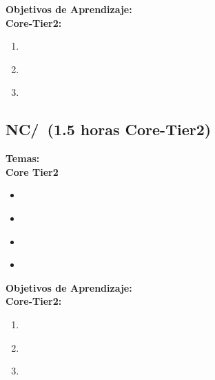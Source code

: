 \noindent \textbf{Objetivos de Aprendizaje:}\\
\noindent \textbf{Core-Tier2:}
\begin{enumerate}
	\setcounter{enumi}{0}
	\item \NCReliableDataDeliveryLODescribeTheReliable\xspace[\NCReliableDataDeliveryLODescribeTheReliableLevel]\label{sec:BOK:NCReliableDataDeliveryLODescribeTheReliable}
	\item \NCReliableDataDeliveryLOListTheAffect\xspace[\NCReliableDataDeliveryLOListTheAffectLevel]\label{sec:BOK:NCReliableDataDeliveryLOListTheAffect}
	\item \NCReliableDataDeliveryLODesignAndSimple\xspace[\NCReliableDataDeliveryLODesignAndSimpleLevel]\label{sec:BOK:NCReliableDataDeliveryLODesignAndSimple}
\end{enumerate}


\subsection{NC/\NCRoutingandForwarding~(1.5 horas Core-Tier2)}\label{sec:BOK:NCRoutingandForwarding}
\noindent \textbf{Temas:}\\
\noindent \textbf{Core Tier2}
\begin{itemize}
	\item \NCRoutingandForwardingTopicRouting\label{sec:BOK:NCRoutingandForwardingTopicRouting}
	\item \NCRoutingandForwardingTopicStatic\label{sec:BOK:NCRoutingandForwardingTopicStatic}
	\item \NCRoutingandForwardingTopicInternet\label{sec:BOK:NCRoutingandForwardingTopicInternet}
	\item \NCRoutingandForwardingTopicScalability\label{sec:BOK:NCRoutingandForwardingTopicScalability}
\end{itemize}


\noindent \textbf{Objetivos de Aprendizaje:}\\
\noindent \textbf{Core-Tier2:}
\begin{enumerate}
	\setcounter{enumi}{0}
	\item \NCRoutingandForwardingLODescribeTheThe\xspace[\NCRoutingandForwardingLODescribeTheTheLevel]\label{sec:BOK:NCRoutingandForwardingLODescribeTheThe}
	\item \NCRoutingandForwardingLODescribeHowForwarded\xspace[\NCRoutingandForwardingLODescribeHowForwardedLevel]\label{sec:BOK:NCRoutingandForwardingLODescribeHowForwarded}
	\item \NCRoutingandForwardingLOListTheOf\xspace[\NCRoutingandForwardingLOListTheOfLevel]\label{sec:BOK:NCRoutingandForwardingLOListTheOf}
\end{enumerate}


